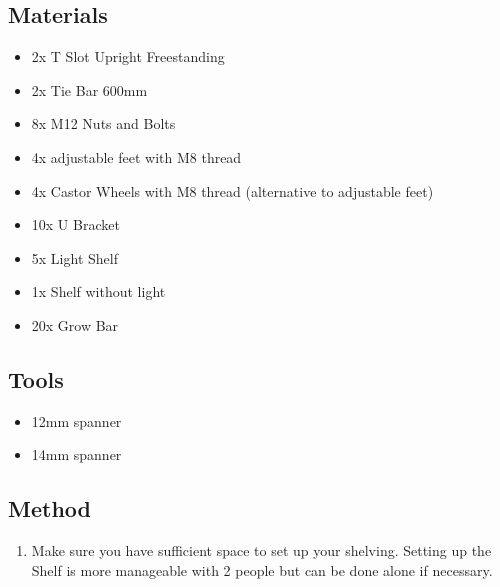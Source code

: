 \documentclass[letterpaper,10pt,english]{sphinxmanual}
\begin{document}
\noindent{}


\subsection{Materials}
\label{\detokenize{shelving_freestanding:materials}}\begin{itemize}
\item {} 
2x T Slot Upright Freestanding

\item {} 
2x Tie Bar 600mm

\item {} 
8x M12 Nuts and Bolts

\item {} 
4x adjustable feet with M8 thread

\item {} 
4x Castor Wheels with M8 thread (alternative to adjustable feet)

\item {} 
10x U Bracket

\item {} 
5x Light Shelf

\item {} 
1x Shelf without light

\item {} 
20x Grow Bar

\end{itemize}


\subsection{Tools}
\label{\detokenize{shelving_freestanding:tools}}\begin{itemize}
\item {} 
12mm spanner

\item {} 
14mm spanner

\end{itemize}


\subsection{Method}
\label{\detokenize{shelving_freestanding:method}}\begin{enumerate}
%
\item {} 
Make sure you have sufficient space to set up your shelving. Setting up the Shelf is more manageable with 2 people but can be done alone if necessary.

\end{enumerate}
\end{document}

